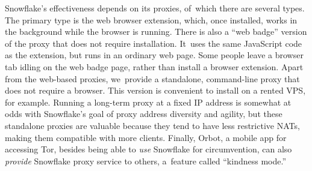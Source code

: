 \documentclass[letterpaper,twocolumn]{article}
\begin{document}
\begin{figure}
\end{figure}

Snowflake's effectiveness depends on its proxies,
of~which there are several types.
The primary type is the web browser extension,
which, once installed, works in the background
while the browser is running.
There is also a ``web badge'' version of the proxy that does not require installation.
It~uses the same JavaScript code as the extension, but runs in an ordinary web page.
Some people leave a browser tab idling on the web badge page,
rather than install a browser extension.
Apart from the web-based proxies,
we~provide a standalone, command-line proxy
that does not require a browser.
This version is convenient to install on a rented VPS, for example.
Running a long-term proxy at a fixed IP address
is somewhat at odds with Snowflake's goal of proxy address diversity and agility,
but these standalone proxies are valuable because
they tend to have less restrictive NATs,
making them compatible with more clients.
Finally, Orbot, a mobile app for accessing Tor,
besides being able to \emph{use} Snowflake for circumvention,
can also \emph{provide} Snowflake proxy service to others,
a~feature called ``kindness mode.''
\end{document}
